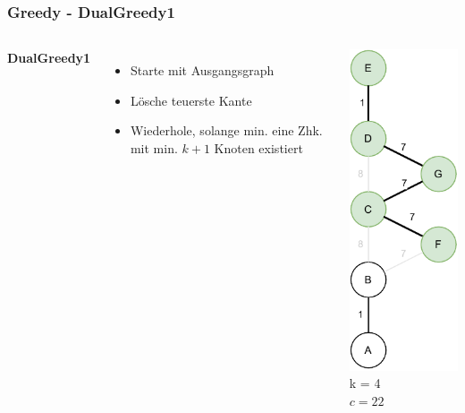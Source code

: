 \documentclass[aspectratio=169]{beamer}
\begin{document}
\begin{frame}
	\frametitle{Greedy - DualGreedy1}
	\begin{columns}[c] %
		
		\textbf{DualGreedy1}
		\begin{itemize}
			\item Starte mit Ausgangsgraph
			\item Lösche teuerste Kante
			\item Wiederhole, solange min. eine Zhk. mit min. $k+1$ Knoten existiert 
		\end{itemize}
		\includegraphics[scale=.6]{greedy_greedy1.pdf}
		k = 4\\
		$c = 22$
		
		
	\end{columns}
	\end{frame}
	
\end{document}
